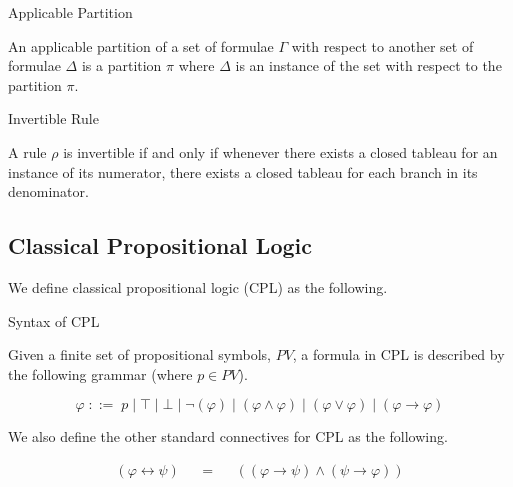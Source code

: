 \documentclass{llncs}
\begin{document}
\begin{definition}{Applicable Partition}\label{Applicable Partition}

An applicable partition of a set of formulae $\Gamma$ with respect to another
set of formulae $\Delta$ is a partition $\pi$ where $\Delta$ is an instance of
the set with respect to the partition $\pi$.
\end{definition}

\begin{definition}{Invertible Rule}\label{Invertible Rule}

A rule $\rho$ is invertible if and only if whenever there exists a closed
tableau for an instance of its numerator, there exists a closed tableau for
each branch in its denominator.
\end{definition}

\subsection{Classical Propositional Logic}

We define classical propositional logic (CPL) as the following.

\begin{definition}{Syntax of CPL}\label{Syntax of CPL}

Given a finite set of propositional symbols, $PV$, a formula in CPL is
described by the following grammar (where $p \in PV$).

\begin{equation*}
\varphi \; ::= \; p \; \vert \; \top \; \vert \; \bot \; \vert \; \neg
(\varphi) \; \vert \; (\varphi \wedge \varphi) \; \vert \; (\varphi \vee
\varphi) \; \vert \; (\varphi \rightarrow \varphi)
\end{equation*}

We also define the other standard connectives for CPL as the following.

$$
\begin{array}{rlcll}
(\varphi \leftrightarrow \psi) &&=&& ((\varphi \rightarrow \psi) \wedge (\psi
\rightarrow \varphi)) \\
\end{array}
$$
\end{definition}
\end{document}
